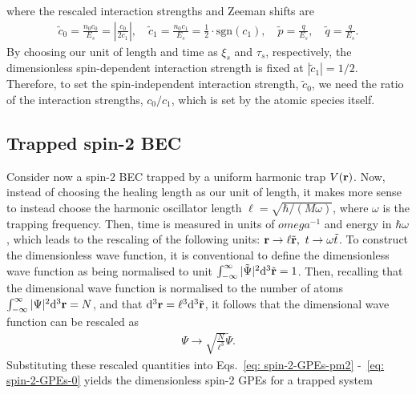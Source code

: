 where the rescaled interaction strengths and Zeeman shifts are
\begin{align}
    \tilde{c}_0 = \frac{n_0c_0}{E_s} = \left|\frac{c_0}{2c_1}\right|, \quad
    \tilde{c}_1 = \frac{n_0c_1}{E_s} = \frac{1}{2} \cdot \text{sgn}(c_1),\quad
    \tilde{p} = \frac{q}{E_s}, \quad
    \tilde{q} = \frac{q}{E_s}.
\end{align}
By choosing our unit of length and time as \(\xi_s\) and \(\tau_s\),
respectively, the dimensionless spin-dependent interaction strength is fixed
at \(|\tilde{c}_1| = 1/2\).
Therefore, to set the spin-independent interaction strength, \(\tilde{c}_0\),
we need the ratio of the interaction strengths, \(c_0/c_1\), which is set by
the atomic species itself.

\subsection{Trapped spin-2 BEC}\label{subsec: spin-2-dimensionless}
Consider now a spin-2 BEC trapped by a uniform harmonic trap \(V(\vb{r})\).
Now, instead of choosing the healing length as our unit of length, it makes more
sense to instead choose the harmonic oscillator length \(\ell =
\sqrt{\hbar/(M\omega)}\), where \(\omega \) is the trapping frequency.
Then, time is measured in units of \(omega^{-1}\) and energy in
\(\hbar\omega \), which leads to the rescaling of the following units:
\(\vb{r}\rightarrow \ell\tilde{\vb{r}},\ t \rightarrow \omega\tilde{t}\).
To construct the dimensionless wave function, it is conventional to define the
dimensionless wave function as being normalised to unit
\(\int_{-\infty}^\infty |\tilde{\Psi}|^2\dd^3\tilde{\vb{r}} = 1\).
Then, recalling that the dimensional wave function is normalised to the number
of atoms \(\int_{-\infty}^\infty |{\Psi}|^2\dd^3{\vb{r}} = N\), and that
\(\dd^3\vb{r} = \ell^3\dd^3\tilde{\vb{r}}\), it follows that the dimensional
wave function can be rescaled as
\begin{align}
    \Psi \rightarrow \sqrt{\frac{N}{\ell^3}}\tilde{\Psi}.
\end{align}
Substituting these rescaled quantities into Eqs.~\eqref{eq: spin-2-GPEs-pm2}
-~\eqref{eq: spin-2-GPEs-0} yields the dimensionless spin-2 GPEs for a trapped
system
